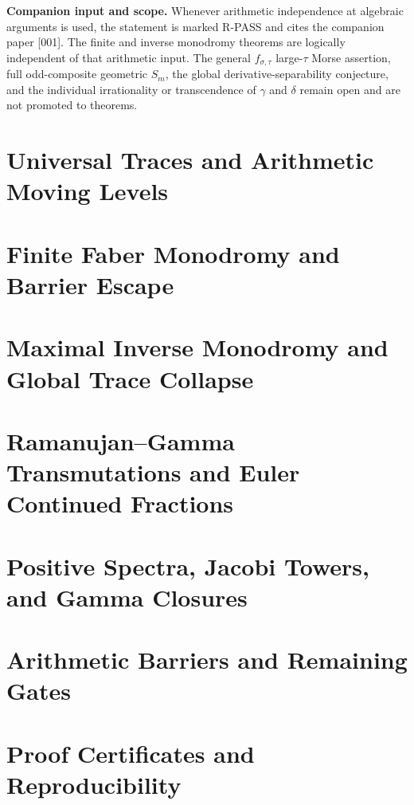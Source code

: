 \documentclass[11pt]{article}
\theoremstyle{keio}
\theoremstyle{definition}
\theoremstyle{remark}
\newcommand{\RPASS}{\textcolor{keioxblue}{\textsf{R-PASS}}}
\begin{document}
\begin{notebox}
\textbf{Companion input and scope.}
Whenever arithmetic independence at algebraic arguments is used, the statement
is marked \RPASS{} and cites the companion paper [001].  The finite and inverse
monodromy theorems are logically independent of that arithmetic input.  The
general \(f_{\sigma,\tau}\) large-\(\tau\) Morse assertion, full odd-composite
geometric \(S_m\), the global derivative-separability conjecture, and the
individual irrationality or transcendence of \(\gamma\) and \(\delta\) remain
open and are not promoted to theorems.
\end{notebox}

\tableofcontents
\newpage
{}

\part{Universal Traces and Arithmetic Moving Levels}


\part{Finite Faber Monodromy and Barrier Escape}




\part{Maximal Inverse Monodromy and Global Trace Collapse}


\part{Ramanujan--Gamma Transmutations and Euler Continued Fractions}


\part{Positive Spectra, Jacobi Towers, and Gamma Closures}







\part{Arithmetic Barriers and Remaining Gates}



\clearpage
\appendix
\part{Proof Certificates and Reproducibility}



\clearpage

\end{document}
